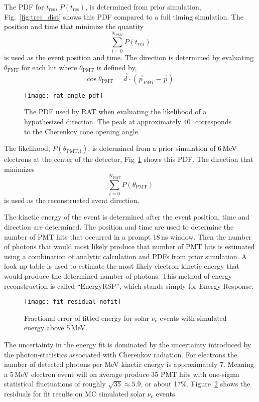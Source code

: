 The PDF for $t_{\mathrm{res}}$, $P(t_{\mathrm{res}})$, is determined from prior simulation,
Fig.~\ref{fig:tres_dist} shows this PDF compared to a full timing simulation.
The position and time that minimize the quantity
\begin{equation}
\sum_{i=0}^{N_{PMT}} P(t_{res}) %
\end{equation}
is used as the event position and time.
The direction is determined by evaluating $\theta_{\mathrm{PMT}}$ for each hit where
$\theta_{\mathrm{PMT}}$ is defined by,
\begin{equation}
    \cos\theta_{\mathrm{PMT}} = \vec{d}\cdot\left(\vec{p}_{PMT} - \vec{p}\right)\text{.}
\end{equation}
\begin{figure}[htbp]
\centering
\texttt{[image: rat\_angle\_pdf]}
\caption[RAT PDF for Direction Fit]{The PDF used by RAT when evaluating the
likelihood of a hypothesized direction.  The peak at approximately $40^{\circ}$
corresponds to the Cherenkov cone opening angle.}
\label{fig:rat_angle_pdf}
\end{figure}

The likelihood, $P(\theta_{\mathrm{PMT, i}})$, is determined from a prior simulation of
6\,MeV electrons at the center of the detector, Fig~\ref{fig:rat_angle_pdf} shows
this PDF\@.
The direction that minimizes
\begin{equation}
\sum_{i=0}^{N_{PMT}} P(\theta_{\mathrm{PMT}})
\end{equation}
is used as the reconstructed event direction.

The kinetic energy of the event is determined after
the event position, time and direction are determined.
The position and time are used to determine the number of PMT
hits that occurred in a prompt 18\,ns window.
Then the number of photons that would most likely produce
that number of PMT hits is estimated using a combination of
analytic calculation and PDFs from prior simulation.
A look up table is used to estimate the most likely electron
kinetic energy that would produce the determined number of photons.
This method of energy reconstruction is called ``EnergyRSP'', which stands
simply for Energy Response.

\begin{figure}[htbp]
\centering
\texttt{[image: fit\_residual\_nofit]}
\caption[EnergyRSP Fit Residuals]{Fractional error of fitted energy   for solar $\nu_{\mathrm{e}}$ events
with simulated energy above 5\,MeV.
}
\label{fig:mc_fit_residuals}
\end{figure}
The uncertainty in the energy fit is dominated by the uncertainty
introduced by the photon-statistics associated with Cherenkov radiation.
For electrons the number of detected photons per MeV kinetic energy is approximately 7.
Meaning a 5\,MeV electron event will on average produce 35 PMT hits with
one-sigma statistical fluctuations of roughly $\sqrt{35} \approx 5.9$, or about 17\%.
Figure~\ref{fig:mc_fit_residuals} shows the residuals for fit results on MC simulated solar $\nu_{e}$ events.

